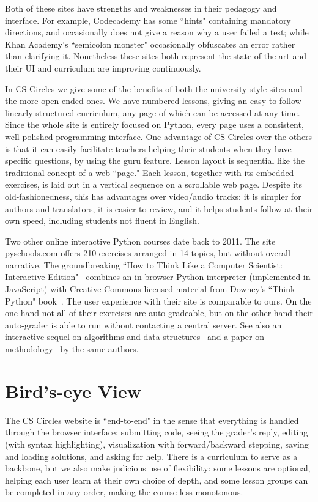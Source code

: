 \documentclass{article}
\begin{document}
{Both of these sites have strengths and weaknesses in their pedagogy and interface. For example, Codecademy has some ``hints" containing mandatory directions, and occasionally does not give a reason why a user failed a test; while Khan Academy's ``semicolon monster" occasionally obfuscates an error rather than clarifying it. Nonetheless these sites both represent the state of the art and their UI and curriculum are improving continuously.

In CS Circles we give some of the benefits of both the university-style sites and the more open-ended ones. We have numbered lessons, giving an easy-to-follow linearly structured curriculum, any page of which can be accessed at any time. Since the whole site is entirely focused on Python, every page uses a consistent, well-polished programming interface. One advantage of CS Circles over the others is that it can easily facilitate teachers helping their students when they have specific questions, by using the guru feature. Lesson layout is sequential like the traditional concept of a web ``page." Each lesson, together with its embedded exercises, is laid out in a vertical sequence on a scrollable web page. Despite its old-fashionedness, this has advantages over video/audio tracks: it is simpler for authors and translators, it is easier to review, and it helps students follow at their own speed, including students not fluent in English.

Two other online interactive Python courses date back to 2011. The site \url{pyschools.com} offers 210 exercises arranged in 14 topics, but without overall narrative. The groundbreaking ``How to Think Like a Computer Scientist: Interactive Edition"~\cite{MR11} combines an in-browser Python interpreter (implemented in JavaScript) with Creative Commons-licensed material from Downey's ``Think Python" book~\cite{Downey08}. The user experience with their site is comparable to ours. On the one hand not all of their exercises are auto-gradeable, but on the other hand their auto-grader is able to run without contacting a central server. See also an interactive sequel on algorithms and data structures~\cite{MR12} and a paper on methodology~\cite{MR12conf} by the same authors.


\section{Bird's-eye View}\label{sec:philosophy}
The CS Circles website is ``end-to-end" in the sense that everything is handled through the browser interface: submitting code, seeing the grader's reply, editing (with syntax highlighting), visualization with forward/backward stepping, saving and loading solutions, and asking for help. There is a curriculum to serve as a backbone, but we also make judicious use of flexibility: some lessons are optional, helping each user learn at their own choice of depth, and some lesson groups can be completed in any order, making the course less monotonous.

}
\end{document}
